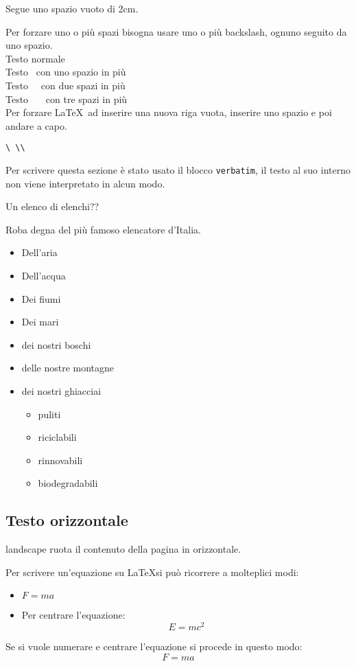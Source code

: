 \documentclass[envcountsame,envcountchap]{svmono}
\begin{document}
Segue uno spazio vuoto di 2cm.

\vspace*{2cm}

Per forzare uno o più spazi bisogna usare uno o più backslash, ognuno seguito da uno spazio.\\
Testo normale\\
Testo \ con uno spazio in più\\
Testo \ \ con due spazi in più\\
Testo \ \ \ con tre spazi in più\\

Per forzare \LaTeX\ ad inserire una nuova riga vuota, inserire uno spazio e poi andare a capo.\\
\begin{verbatim}
\ \\
\end{verbatim}
Per scrivere questa sezione è stato usato il blocco {\tt verbatim}, il testo al suo interno non viene
interpretato in alcun modo.



Un elenco di elenchi??

Roba degna del più famoso elencatore d'Italia. \citep{elencatoreSeriale}
\begin{itemize}
    \item Dell'aria
    \item Dell'acqua
    \item Dei fiumi
    \item Dei mari
    \item dei nostri boschi
    \item delle nostre montagne
    \item dei nostri ghiacciai
    \begin{itemize}
        \item puliti
        \item riciclabili
        \item rinnovabili
        \item biodegradabili
    \end{itemize} 
\end{itemize}





\newpage
\begin{landscape}
    \section{Testo orizzontale}
    landscape ruota il contenuto della pagina in orizzontale.
    
    Per scrivere un'equazione su \LaTeX si può ricorrere a molteplici modi:
    \begin{itemize}
        \item $F=ma$
        \item Per centrare l'equazione:
        \[E=mc^2\]
    \end{itemize}
    Se si vuole numerare e centrare l'equazione si procede in questo modo:
    \begin{equation}
        F=ma 
    \end{equation}

\end{landscape}
\end{document}
